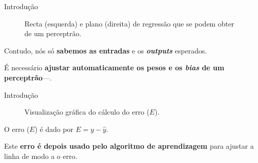 \begin{frame}{Introdução \cont}
		
	\begin{figure}
		\centering
		\begin{subfigure}{0.45\textwidth}
			\centering
			\resizebox{!}{0.7\linewidth}{
				
			}
		\end{subfigure}
		\begin{subfigure}{0.45\textwidth}
			\centering
			\resizebox{!}{0.7\linewidth}{
				
			}
		\end{subfigure}
		\caption{Recta (esquerda) e plano (direita) de regressão que se podem obter de um perceptrão.}
	\end{figure}
		    
	Contudo, nós só \textbf{sabemos as entradas} e os \textit{\textbf{outputs}} esperados.
    
    \pauseskip
    
	É necessário \textbf{ajustar automaticamente os pesos e os \textit{bias} de um perceptrão}---.
		    
\end{frame}

\begin{frame}{Introdução \cont}
		
	\begin{figure}
		\centering
		\resizebox{!}{0.4\textwidth}{
			
		}
		\caption{Visualização gráfica do cálculo do erro ($E$).}
	\end{figure}
		    
	O erro ($E$) é dado por $E = y - \hat{y}$.
	
	\pauseskip
	
	Este \textbf{erro é depois usado pelo algoritmo de aprendizagem} para ajustar a linha de modo a  o erro. 
		
\end{frame}

